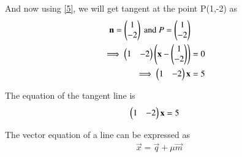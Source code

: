 \documentclass[journal,12pt,twocolumn]{IEEEtran}
\begin{document}
And now using \eqref{5}, we will get tangent at the point P(1,-2) as
\begin{align}
    \mathbf{n} =  \begin{pmatrix}1\\-2\end{pmatrix}\text{ and }
    P = \begin{pmatrix}1\\-2\end{pmatrix}\\
    \implies \begin{pmatrix}1&-2\end{pmatrix}\left(\mathbf{x}-\begin{pmatrix}1\\-2\end{pmatrix}\right) &= 0\\
    \implies \begin{pmatrix}1&-2\end{pmatrix}\mathbf{x}&= 5
\end{align}


The equation of the tangent line is
\begin{align}
\begin{pmatrix}1&-2\end{pmatrix}\mathbf{x}&= 5 \label{a}
\end{align}

The vector equation of a line can be expressed as 
\begin{align}
    \vec{x} = \vec{q} +\mu\vec{m}\label{c}
\end{align}
\end{document}
